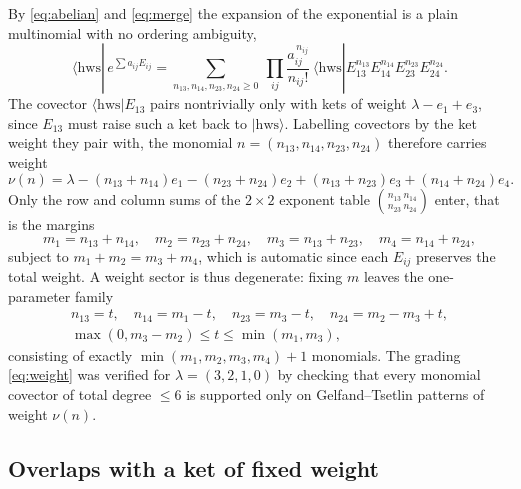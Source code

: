 \documentclass[12pt]{article}
\newcommand{\hws}{\mathrm{hws}}
\begin{document}
By \eqref{eq:abelian} and \eqref{eq:merge} the expansion of the exponential is a
plain multinomial with no ordering ambiguity,
\begin{equation}
\langle\hws|\,e^{\sum a_{ij}E_{ij}}
=\sum_{n_{13},n_{14},n_{23},n_{24}\geq0}
\ \prod_{ij}\frac{a_{ij}^{\,n_{ij}}}{n_{ij}!}\
\langle\hws|E_{13}^{n_{13}}E_{14}^{n_{14}}E_{23}^{n_{23}}E_{24}^{n_{24}} .
\label{eq:expansion}
\end{equation}
The covector $\langle\hws|E_{13}$ pairs nontrivially only with kets of weight
$\lambda-e_1+e_3$, since $E_{13}$ must raise such a ket back to $|\hws\rangle$.
Labelling covectors by the ket weight they pair with, the monomial
$n=(n_{13},n_{14},n_{23},n_{24})$ therefore carries weight
\begin{equation}
\nu(n)=\lambda-(n_{13}+n_{14})e_1-(n_{23}+n_{24})e_2+(n_{13}+n_{23})e_3+(n_{14}+n_{24})e_4 .
\label{eq:weight}
\end{equation}
Only the row and column sums of the $2\times2$ exponent table
$\binom{n_{13}\ n_{14}}{n_{23}\ n_{24}}$ enter, that is the margins
\begin{equation}
m_1=n_{13}+n_{14},\quad m_2=n_{23}+n_{24},\quad
m_3=n_{13}+n_{23},\quad m_4=n_{14}+n_{24},
\label{eq:margins}
\end{equation}
subject to $m_1+m_2=m_3+m_4$, which is automatic since each $E_{ij}$ preserves
the total weight. A weight sector is thus degenerate: fixing $m$ leaves the
one-parameter family
\begin{equation}
\begin{gathered}
n_{13}=t,\quad n_{14}=m_1-t,\quad n_{23}=m_3-t,\quad n_{24}=m_2-m_3+t,\\
\max(0,m_3-m_2)\leq t\leq\min(m_1,m_3),
\end{gathered}
\label{eq:tfamily}
\end{equation}
consisting of exactly $\min(m_1,m_2,m_3,m_4)+1$ monomials. The grading
\eqref{eq:weight} was verified for $\lambda=(3,2,1,0)$ by checking that every
monomial covector of total degree $\leq6$ is supported only on Gelfand--Tsetlin
patterns of weight $\nu(n)$.

\subsection{Overlaps with a ket of fixed weight}
\end{document}
